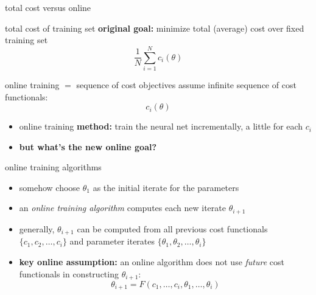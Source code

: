 \documentclass[xcolor={svgnames},
               hyperref={colorlinks,citecolor=DeepPink4,linkcolor=FireBrick,urlcolor=Maroon}]
               {beamer}
\begin{document}
\begin{frame}{total cost versus online}

\begin{block}{total cost of training set}
\textbf{original goal:}  minimize total (average) cost over fixed training set
    $$\frac{1}{N} \sum_{i=1}^N c_i(\theta)$$
\end{block}

\begin{block}{online training $=$ sequence of cost objectives}
assume infinite sequence of cost functionals:
    $$c_i(\theta)$$
\end{block}

\begin{itemize}
\item online training \textbf{method:} train the neural net incrementally, a little for each $c_i$
\item \textbf{but what's the new online goal?}
\end{itemize}

\end{frame}


\begin{frame}{online training algorithms}

\begin{itemize}
\item somehow choose $\theta_1$ as the initial iterate for the parameters
\item an \emph{online training algorithm} computes each new iterate $\theta_{i+1}$
\item generally, $\theta_{i+1}$ can be computed from all previous cost functionals $\{c_1,c_2,\dots,c_i\}$ and parameter iterates $\{\theta_1,\theta_2,\dots,\theta_i\}$
\item \textbf{key online assumption:} an online algorithm does not use \emph{future} cost functionals in constructing $\theta_{i+1}$:
    $$\theta_{i+1} = F(c_1,\dots,c_i,\theta_1,\dots,\theta_i)$$
\end{itemize}
\end{frame}
\end{document}
